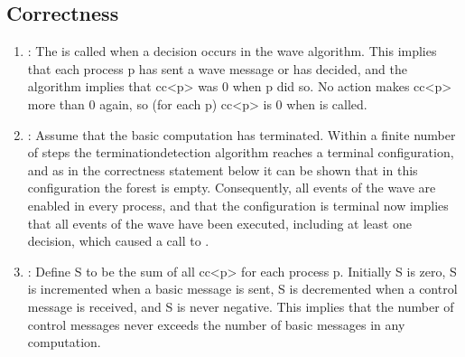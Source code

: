 \documentclass[letterpaper,10pt,english]{sphinxmanual}
\begin{document}
\subsection{Correctness}
\label{\detokenize{docs/ShavitFrancez/algorithm:correctness}}\begin{enumerate}
%
\item {} 
\sphinxAtStartPar
{}: The  is called when a decision occurs in the wave algorithm. This implies that each process p has sent a wave message or has decided, and the algorithm implies that cc\textless{}p\textgreater{} was 0 when p did so. No action makes cc\textless{}p\textgreater{} more than 0 again, so (for each p) cc\textless{}p\textgreater{} is 0 when  is called. 

\item {} 
\sphinxAtStartPar
{}: Assume that the basic computation has terminated. Within a finite number of steps the termination\sphinxhyphen{}detection algorithm reaches a terminal configuration, and as in the correctness statement below it can be shown that in this configuration the forest is empty. Consequently, all events of the wave are enabled in every process, and that the configuration is terminal now implies that all events of the wave have been executed, including at least one decision, which caused a call to . 

\item {} 
\sphinxAtStartPar
{}: Define S to be the sum of all cc\textless{}p\textgreater{} for each process p. Initially S is zero, S is incremented when a basic message is sent, S is decremented when a control message is received, and S is never negative. This implies that the number of control messages never exceeds the number of basic messages in any computation. 

\end{enumerate}
\end{document}
